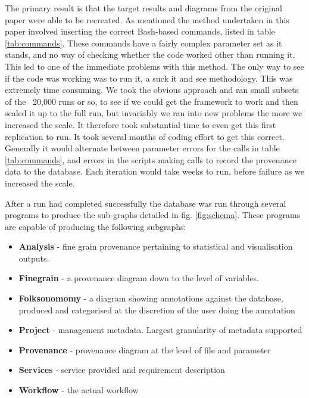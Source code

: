 \documentclass[runningheads]{llncs}
\begin{document}
The primary result is that the target results and diagrams from the original
paper \cite{polhill2017lessons} were able to be recreated.  As mentioned the
method undertaken in this paper involved inserting the correct Bash-based
commands, listed in table \ref{tab:commands}. These commands have a fairly
complex parameter set as it stands, and no way of checking whether the code
worked other than running it. This led to one of the immediate problems with
this method. The only way to see if the code was working was to run it, a suck
it and see methodology. This was extremely time consuming. We took the obvious
approach and ran small subsets of the ~20,000 runs or so, to see if we could
get the framework to work and then scaled it up to the full run, but invariably
we ran into new problems the more we increased the scale. It therefore took
substantial time to even get this first replication to run. It took several
months of coding effort to get this correct. Generally it would alternate
between parameter errors for the calls in table \ref{tab:commands}, and errors in the scripts making calls to record the provenance data to the database. Each iteration would take weeks to run, before failure as we increased the scale.

After a run had completed successfully the database was run through several
programs to produce the sub-graphs detailed in fig. \ref{fig:schema}. These
programs are capable of producing the following subgraphs:

\begin{itemize} \item \textbf{Analysis} - fine grain provenance pertaining to
            statistical and visualisation outputs.

        \item \textbf{Finegrain} - a provenance diagram down to the level of
        variables.  \item \textbf{Folksonomomy} - a diagram showing annotations
            against the database, produced and categorised at the discretion of
            the user doing the annotation \item \textbf{Project} - management
            metadata. Largest granularity of metadata supported \item
            \textbf{Provenance} - provenance diagram at the level of file and
        parameter \item \textbf{Services} - service provided and requirement
            description \item \textbf{Workflow} - the actual workflow
\end{itemize}
\end{document}
